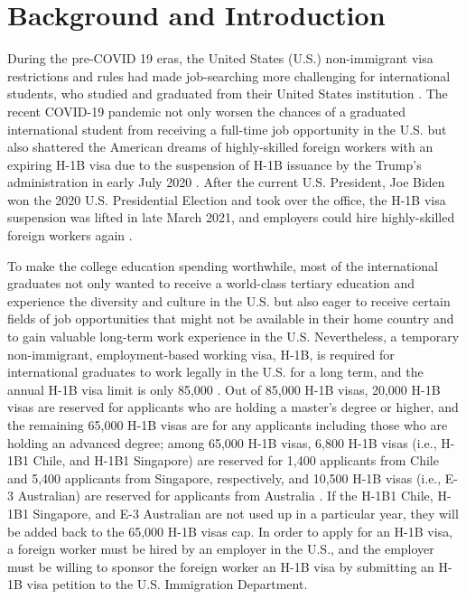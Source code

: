 \documentclass[conference]{IEEEtran}
\begin{document}
\section{Background and Introduction}
\label{s1}
During the pre-COVID 19 eras, the United States (U.S.) non-immigrant visa restrictions and rules had made job-searching more challenging for international students, who studied and graduated from their United States institution \cite{b1}. The recent COVID-19 pandemic not only worsen the chances of a graduated international student from receiving a full-time job opportunity in the U.S. but also shattered the American dreams of highly-skilled foreign workers with an expiring H-1B visa due to the suspension of H-1B issuance by the Trump's administration in early July 2020 \cite{b2}. After the current U.S. President, Joe Biden won the 2020 U.S. Presidential Election and took over the office, the H-1B visa suspension was lifted in late March 2021, and employers could hire highly-skilled foreign workers again \cite{b3}. 

To make the college education spending worthwhile, most of the international graduates not only wanted to receive a world-class tertiary education and experience the diversity and culture in the U.S. but also eager to receive certain fields of job opportunities that might not be available in their home country and to gain valuable long-term work experience in the U.S. Nevertheless, a temporary non-immigrant, employment-based working visa, H-1B, is required for international graduates to work legally in the U.S. for a long term, and the annual H-1B visa limit is only 85,000 \cite{b4}. Out of 85,000 H-1B visas, 20,000 H-1B visas are reserved for applicants who are holding a master's degree or higher, and the remaining 65,000 H-1B visas are for any applicants including those who are holding an advanced degree; among 65,000 H-1B visas, 6,800 H-1B visas (i.e., H-1B1 Chile, and H-1B1 Singapore) are reserved for 1,400 applicants from Chile and 5,400 applicants from Singapore, respectively, and 10,500 H-1B visas (i.e., E-3 Australian) are reserved for applicants from Australia \cite{b5}. If the H-1B1 Chile, H-1B1 Singapore, and E-3 Australian are not used up in a particular year, they will be added back to the 65,000 H-1B visas cap. In order to apply for an H-1B visa, a foreign worker must be hired by an employer in the U.S., and the employer must be willing to sponsor the foreign worker an H-1B visa by submitting an H-1B visa petition to the U.S. Immigration Department.
\end{document}
